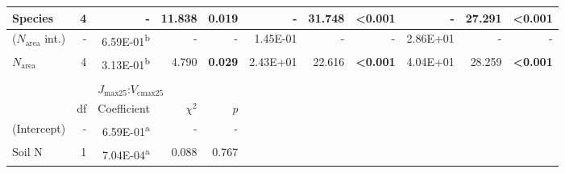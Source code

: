 \begin{landscape}
\begin{table}[]
{\begin{tabular}{p{2.5cm}p{0.5cm}p{2cm}p{1.5cm}p{1.5cm}p{2cm}p{1.5cm}p{1.5cm}p{2cm}p{1.5cm}p{1.5cm}}
                 Species & \multicolumn{1}{r}{4}
                 & \multicolumn{1}{r}{-} & \multicolumn{1}{r}{11.838} & \multicolumn{1}{r}{\textbf{0.019}}
                 & \multicolumn{1}{r}{-} & \multicolumn{1}{r}{31.748} & \multicolumn{1}{r}{\textbf{\textless{}0.001}}
                 & \multicolumn{1}{r}{-} & \multicolumn{1}{r}{27.291} & \multicolumn{1}{r}{\textbf{\textless{}0.001}}
                 \\
                 \hline

                 ($N_\mathrm{area}$ int.) & \multicolumn{1}{r}{-}
                 & \multicolumn{1}{r}{6.59E-01\textsuperscript{b}} & \multicolumn{1}{r}{-} & \multicolumn{1}{r}{-}
                 & \multicolumn{1}{r}{1.45E-01}                    & \multicolumn{1}{r}{-} & \multicolumn{1}{r}{-}
                 & \multicolumn{1}{r}{2.86E+01}                    & \multicolumn{1}{r}{-} & \multicolumn{1}{r}{-}
                 \\

                 $N_\mathrm{area}$ & \multicolumn{1}{r}{4}
                 & \multicolumn{1}{r}{3.13E-01\textsuperscript{b}} & \multicolumn{1}{r}{4.790} & \multicolumn{1}{r}{\textbf{0.029}}
                 & \multicolumn{1}{r}{2.43E+01}                    & \multicolumn{1}{r}{22.616} & \multicolumn{1}{r}{\textbf{\textless{}0.001}}
                 & \multicolumn{1}{r}{4.04E+01}                    & \multicolumn{1}{r}{28.259} & \multicolumn{1}{r}{\textbf{\textless{}0.001}}
                 \\
                 \hline

                 &&&&&&&&&&
                 \\

                 && \multicolumn{3}{l}{$J_{\mathrm{max25}}$:$V_\mathrm{cmax25}$} &&&&& \\
                 \hline
                 & \multicolumn{1}{r}{df}
                 & \multicolumn{1}{r}{Coefficient} & \multicolumn{1}{r}{$\chi^{2}$} & \multicolumn{1}{r}{\textit{p}} 
                 \\
                 \hline

                 (Intercept) & \multicolumn{1}{r}{-}
                 & \multicolumn{1}{r}{6.59E-01\textsuperscript{a}} & \multicolumn{1}{r}{-} & \multicolumn{1}{r}{-}
                 &&&&&&
                 \\

                 Soil N & \multicolumn{1}{r}{1}
                 & \multicolumn{1}{r}{7.04E-04\textsuperscript{a}}  & \multicolumn{1}{r}{0.088} & \multicolumn{1}{r}{0.767}
                 &&&&&& 
                 \\


\end{tabular}}
\end{table}
\end{landscape}
